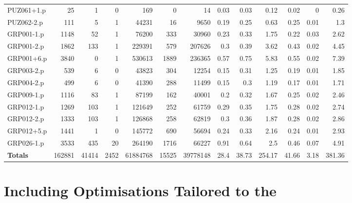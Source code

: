 \begin{table}[H]
\begin{adjustwidth}{-1.1in}{-0.5in}
\begin{tabular}{| l || r | r | r || r | r | r || r | r | r | r | r | r |}
PUZ061+1.p&25&1&0&169&0&14&0.03&0.03&0.12&0.02&0&0.26\\
PUZ062-2.p&111&5&1&44231&16&9650&0.19&0.25&0.63&0.25&0.01&1.3\\
GRP001-1.p&1148&52&1&76200&333&30960&0.23&0.33&1.75&0.22&0.03&2.62\\
GRP001-2.p&1862&133&1&229391&579&207626&0.3&0.39&3.62&0.43&0.02&4.45\\
GRP001+6.p&3840&0&1&530613&1889&236365&0.57&0.75&5.83&0.55&0.02&7.39\\
GRP003-2.p&539&6&0&43823&304&12254&0.15&0.31&1.25&0.19&0.01&1.85\\
GRP004-2.p&499&6&0&41390&288&11499&0.15&0.3&1.19&0.17&0.01&1.71\\
GRP009-1.p&1116&83&1&87199&162&40001&0.2&0.32&1.67&0.25&0.02&2.46\\
GRP012-1.p&1269&103&1&121649&252&61759&0.29&0.35&1.75&0.28&0.02&2.74\\
GRP012-2.p&1333&103&1&126868&258&62819&0.3&0.36&1.87&0.28&0.02&2.86\\
GRP012+5.p&1441&1&0&145772&690&56694&0.24&0.33&2.16&0.24&0.01&2.93\\
GRP026-1.p&3533&435&20&264190&1716&66227&0.91&0.64&2.5&0.46&0.07&4.91\\ \hline \hline
\textbf{Totals}&162881&41414&2452&61884768&15525&39778148&28.4&38.73&254.17&41.66&3.18&381.36\\ \hline
\end{tabular}\end{adjustwidth}\end{table}

\section{Including Optimisations Tailored to the \HSWAC} 

